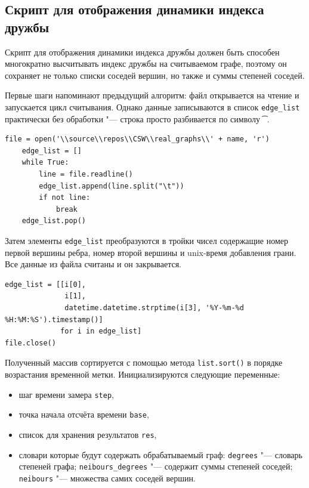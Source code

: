 \documentclass[bachelor, och, diploma]{SCWorks}
\begin{document}
\subsection{Скрипт для отображения динамики индекса дружбы}
Скрипт для отображения динамики индекса дружбы должен быть способен многократно высчитывать индекс дружбы на считываемом графе, поэтому он сохраняет не только списки соседей вершин, но также и суммы степеней соседей. 

Первые шаги напоминают предыдущий алгоритм: файл открывается на чтение и запускается цикл считывания. Однако данные записываются в список \texttt{edge_list} практически без обработки "--- строка просто разбивается по символу \texttt{\t}.
\begin{verbatim}
file = open('\\source\\repos\\CSW\\real_graphs\\' + name, 'r')
    edge_list = []
    while True:
        line = file.readline()
        edge_list.append(line.split("\t"))
        if not line:
            break
    edge_list.pop()
\end{verbatim}
Затем элементы \texttt{edge_list} преобразуются в тройки чисел содержащие номер первой вершины ребра, номер второй вершины и unix-время добавления грани. Все данные из файла считаны и он закрывается.
\begin{verbatim}
edge_list = [[i[0], 
              i[1], 
              datetime.datetime.strptime(i[3], '%Y-%m-%d %H:%M:%S').timestamp()] 
             for i in edge_list]
file.close()
\end{verbatim}
Полученный массив сортируется с помощью метода \texttt{list.sort()} в порядке возрастания временной метки. Инициализируются следующие переменные:
\begin{itemize}
\item шаг времени замера \texttt{step}, 
\item точка начала отсчёта времени \texttt{base}, 
\item список для хранения результатов \texttt{res},
\item словари которые будут содержать обрабатываемый граф:
\subitem \texttt{degrees} "--- словарь степеней графа;
\subitem \texttt{neibours_degrees} "--- содержит суммы степеней соседей;
\subitem \texttt{neibours} "--- множества самих соседей вершин.
\end{itemize}
\end{document}
